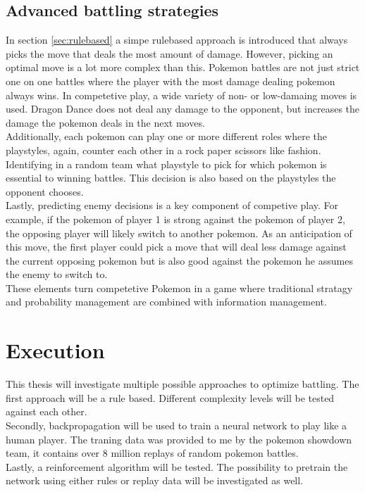 \documentclass{article}
\begin{document}
\subsection{Advanced battling strategies}
In section \ref{sec:rulebased} a simpe rulebased approach is introduced that 
always picks the move that deals the most amount of damage. However, picking 
an optimal move is a lot more complex than this. Pokemon battles are not just
strict one on one battles where the player with the most damage dealing pokemon
always wins. In competetive play, a wide variety of non- or low-damaing moves
is used. Dragon Dance does not deal any damage to the opponent, but increases
the damage the pokemon deals in the next moves. \\
Additionally, each pokemon can play one or more different roles where the 
playstyles, again, counter each other in a rock paper scissors like fashion. 
Identifying in a random team what playstyle to pick for which pokemon is
essential to winning battles. This decision is also based on the playstyles
the opponent chooses. \\
Lastly, predicting enemy decisions is a key component of competive play. For 
example, if the pokemon of player 1 is strong against the pokemon of player 2,
the opposing player will likely switch to another pokemon. As an anticipation
of this move, the first player could pick a move that will deal less damage
against the current opposing pokemon but is also good against the pokemon
he assumes the enemy to switch to. \\
These elements turn competetive Pokemon in a game where traditional stratagy
and probability management are combined with information management.

\section{Execution}
This thesis will investigate multiple possible approaches to optimize battling.
The first approach will be a rule based. Different complexity levels will be
tested against each other. \\
Secondly, backpropagation will be used to train a neural network to play
like a human player. The traning data was provided to me by the pokemon
showdown team, it contains over 8 million replays of random pokemon battles. \\
Lastly, a reinforcement algorithm will be tested. The possibility to pretrain
the network using either rules or replay data will be investigated as well.
\end{document}
